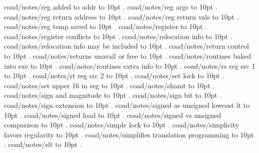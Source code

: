 \smallskip
coad/notes/reg added to addr \leaders\hbox to 10pt {\hss.\hss}  \hfill {}
\smallskip
coad/notes/reg args \leaders\hbox to 10pt {\hss.\hss}  \hfill {}
\smallskip
coad/notes/reg return address \leaders\hbox to 10pt {\hss.\hss}  \hfill {}
\smallskip
coad/notes/reg return vals \leaders\hbox to 10pt {\hss.\hss}  \hfill {}
\smallskip
coad/notes/reg temp saved \leaders\hbox to 10pt {\hss.\hss}  \hfill {}
\smallskip
coad/notes/register \leaders\hbox to 10pt {\hss.\hss}  \hfill {}
\smallskip
coad/notes/register conflicts \leaders\hbox to 10pt {\hss.\hss}  \hfill {}
\smallskip
coad/notes/relocation info \leaders\hbox to 10pt {\hss.\hss}  \hfill {}
\smallskip
coad/notes/relocation info may be included \leaders\hbox to 10pt {\hss.\hss}  \hfill {}
\smallskip
coad/notes/return control \leaders\hbox to 10pt {\hss.\hss}  \hfill {}
\smallskip
coad/notes/returns unavail or free \leaders\hbox to 10pt {\hss.\hss}  \hfill {}
\smallskip
coad/notes/routines baked into exe \leaders\hbox to 10pt {\hss.\hss}  \hfill {}
\smallskip
coad/notes/routines extra info \leaders\hbox to 10pt {\hss.\hss}  \hfill {}
\smallskip
coad/notes/rs reg src 1 \leaders\hbox to 10pt {\hss.\hss}  \hfill {}
\smallskip
coad/notes/rt reg src 2 \leaders\hbox to 10pt {\hss.\hss}  \hfill {}
\smallskip
coad/notes/set lock \leaders\hbox to 10pt {\hss.\hss}  \hfill {}
\smallskip
coad/notes/set upper 16 in reg \leaders\hbox to 10pt {\hss.\hss}  \hfill {}
\smallskip
coad/notes/shamt \leaders\hbox to 10pt {\hss.\hss}  \hfill {}
\smallskip
coad/notes/sign and magnitude \leaders\hbox to 10pt {\hss.\hss}  \hfill {}
\smallskip
coad/notes/sign bit \leaders\hbox to 10pt {\hss.\hss}  \hfill {}
\smallskip
coad/notes/sign extension \leaders\hbox to 10pt {\hss.\hss}  \hfill {}
\smallskip
coad/notes/signed as unsigned lowcost lt \leaders\hbox to 10pt {\hss.\hss}  \hfill {}
\smallskip
coad/notes/signed load \leaders\hbox to 10pt {\hss.\hss}  \hfill {}
\smallskip
coad/notes/signed vs unsigned comparison \leaders\hbox to 10pt {\hss.\hss}  \hfill {}
\smallskip
coad/notes/simple lock \leaders\hbox to 10pt {\hss.\hss}  \hfill {}
\smallskip
coad/notes/simplicity favors regularity \leaders\hbox to 10pt {\hss.\hss}  \hfill {}
\smallskip
coad/notes/simplifies translation programming \leaders\hbox to 10pt {\hss.\hss}  \hfill {}
\smallskip
coad/notes/slt \leaders\hbox to 10pt {\hss.\hss}  \hfill {}
